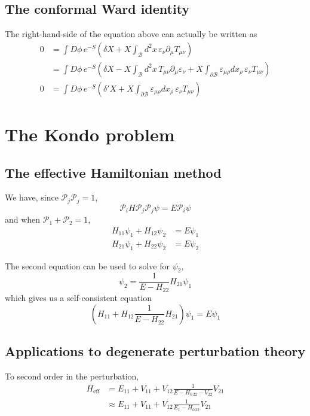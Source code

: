 \documentclass[12pt, oneside]{book}
\begin{document}
\section*{The conformal Ward identity}
The right-hand-side of the equation above can actually be written as
\begin{align*}
0
&=\int D\phi\,e^{-S}\left(\delta X+X\int_{\mathcal{B}}d^2x\,\varepsilon_{\nu}\partial_{\mu}T_{\mu\nu}\right)\\
&=\int D\phi\,e^{-S}\left(\delta X-X\int_{\mathcal{B}}d^2x\,T_{\mu\nu}\partial_{\mu}\varepsilon_{\nu}+X\int_{\partial\mathcal{B}}\varepsilon_{\mu\rho}dx_{\rho}\,\varepsilon_{\nu}T_{\mu\nu}\right)\\[10pt]
0
&=\int D\phi\,e^{-S}\left(\delta'X+X\int_{\partial\mathcal{B}}\varepsilon_{\mu\rho}dx_{\rho}\,\varepsilon_{\nu}T_{\mu\nu}\right)
\end{align*}

\chapter{The Kondo problem}
\section*{The effective Hamiltonian method}
We have, since $\mathcal{P}_j\mathcal{P}_j=1$,
\[
\mathcal{P}_iH\mathcal{P}_j\mathcal{P}_j\psi=E\mathcal{P}_i\psi
\]
and when $\mathcal{P}_1+\mathcal{P}_2=1$,
\begin{align*}
H_{11}\psi_1+H_{12}\psi_2&=E\psi_1\\
H_{21}\psi_1+H_{22}\psi_2&=E\psi_2
\end{align*}

The second equation can be used to solve for $\psi_2$,
\[
\psi_2=\frac1{E-H_{22}}H_{21}\psi_1
\]
which gives us a self-consistent equation
\[
\left(H_{11}+H_{12}\frac1{E-H_{22}}H_{21}\right)\psi_1=E\psi_1
\]

\section*{Applications to degenerate perturbation theory}
To second order in the perturbation,
\begin{align*}
H_{\text{eff}}
&=E_11+V_{11}+V_{12}\frac1{E-H_{0\,22}-V_{22}}V_{21}\\
&\approx E_11+V_{11}+V_{12}\frac1{E_1-H_{0\,22}}V_{21}
\end{align*}
\end{document}
